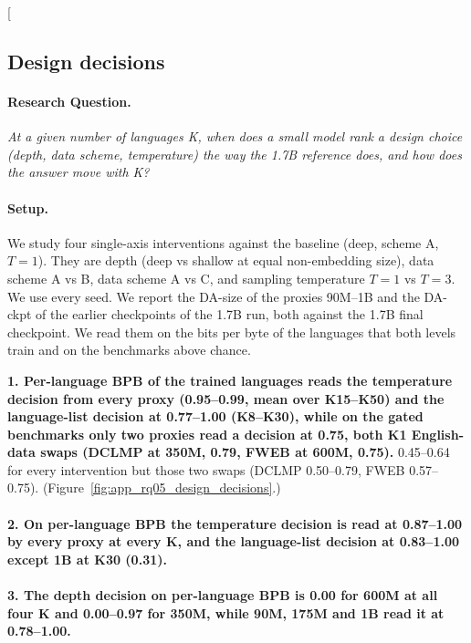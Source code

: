 \clearpage
\twocolumn[{%
\subsection{Design decisions}
\label{app:rq05_design_decisions}

\noindent\begin{minipage}[t]{0.485\textwidth}
\vspace{0pt}
\paragraph{Research Question.} \emph{At a given number of languages K, when does a small model rank a design choice (depth, data scheme, temperature) the way the 1.7B reference does, and how does the answer move with K?}

\paragraph{Setup.} We study four single-axis interventions against the baseline (deep, scheme A, $T = 1$). They are depth (deep vs shallow at equal non-embedding size), data scheme A vs B, data scheme A vs C, and sampling temperature $T = 1$ vs $T = 3$. We use every seed. We report the DA-size of the proxies 90M--1B and the DA-ckpt of the earlier checkpoints of the 1.7B run, both against the 1.7B final checkpoint. We read them on the bits per byte of the languages that both levels train and on the benchmarks above chance.
\end{minipage}\hfill
\begin{minipage}[t]{0.485\textwidth}
\vspace{0pt}
\begin{rqfinding}
\textbf{1. Per-language BPB of the trained languages reads the temperature decision from every proxy (0.95--0.99, mean over K15--K50) and the language-list decision at 0.77--1.00 (K8--K30), while on the gated benchmarks only two proxies read a decision at 0.75, both K1 English-data swaps (DCLMP at 350M, 0.79, FWEB at 600M, 0.75).} 0.45--0.64 for every intervention but those two swaps (DCLMP 0.50--0.79, FWEB 0.57--0.75). (Figure~\ref{fig:app_rq05_design_decisions}.)
\\
\\
\textbf{2. On per-language BPB the temperature decision is read at 0.87--1.00 by every proxy at every K, and the language-list decision at 0.83--1.00 except 1B at K30 (0.31).}
\\
\\
\textbf{3. The depth decision on per-language BPB is 0.00 for 600M at all four K and 0.00--0.97 for 350M, while 90M, 175M and 1B read it at 0.78--1.00.}
\end{rqfinding}
\end{minipage}

}
